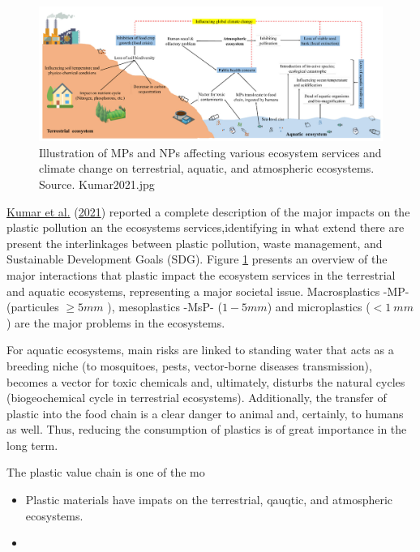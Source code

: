 \documentclass[]{elsarticle} %
\begin{document}
\begin{figure}
\includegraphics[width=1\linewidth]{Figures/Kumar2021} \caption{Illustration of MPs and NPs affecting various ecosystem services and climate change on terrestrial, aquatic, and atmospheric ecosystems. Source. Kumar2021.jpg}\label{fig:fig-Kumar2021}
\end{figure}

\protect\hyperlink{ref-Kumar2021}{Kumar et al.} (\protect\hyperlink{ref-Kumar2021}{2021}) reported a complete description of the major impacts on the plastic pollution an the ecosystems services,identifying in what extend there are present the interlinkages between plastic pollution, waste management, and Sustainable Development Goals (SDG).
Figure \ref{fig:fig-Kumar2021} presents an overview of the major interactions that plastic impact the ecosystem services in the terrestrial and aquatic ecosystems, representing a major societal issue.
Macrosplastics -MP- (particules \(\geq 5mm\) ), mesoplastics -MsP- (\(1-5 mm\)) and microplastics (\(<1~mm\)) are the major problems in the ecosystems.

For aquatic ecosystems, main risks are linked to standing water that acts as a breeding niche (to mosquitoes, pests, vector-borne diseases transmission), becomes a vector for toxic chemicals and, ultimately, disturbs the natural cycles (biogeochemical cycle in terrestrial ecosystems). Additionally, the transfer of plastic into the food chain is a clear danger to animal and, certainly, to humans as well. Thus, reducing the consumption of plastics is of great importance in the long term.

The plastic value chain is one of the mo

\begin{itemize}
\item
  Plastic materials have impats on the terrestrial, qauqtic, and atmospheric ecosystems.
\item
\end{itemize}
\end{document}
